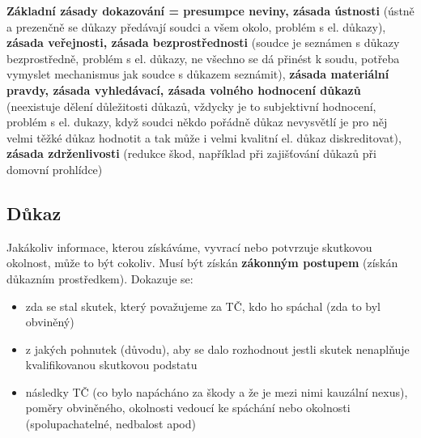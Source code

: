 \textbf{Základní zásady dokazování = presumpce neviny, zásada ústnosti} (ústně a prezenčně se
důkazy předávají soudci a všem okolo, problém s el. důkazy),  \textbf{zásada veřejnosti, zásada bezprostřednosti} (soudce je seznámen s důkazy bezprostředně, problém s el. důkazy, ne
všechno se dá přinést k soudu, potřeba vymyslet mechanismus jak soudce s důkazem seznámit), \textbf{zásada materiální pravdy, zásada vyhledávací, zásada volného
hodnocení důkazů} (neexistuje dělení důležitosti důkazů, vždycky je to subjektivní hodnocení,
problém s el. dukazy, když soudci někdo pořádně důkaz nevysvětlí je pro něj velmi těžké důkaz hodnotit a tak může i velmi kvalitní el. důkaz diskreditovat), \textbf{zásada zdrženlivosti} (redukce škod, například při zajišťování důkazů při domovní prohlídce)

\subsection{Důkaz}
Jakákoliv informace, kterou získáváme, vyvrací nebo potvrzuje skutkovou okolnost, může to být cokoliv. Musí být získán \textbf{zákonným postupem} (získán důkazním prostředkem).
Dokazuje se: 
\begin{itemize}
    \item zda se stal skutek, který považujeme za TČ, kdo ho spáchal (zda to byl obviněný)
    \item z jakých pohnutek (důvodu), aby se dalo rozhodnout jestli skutek nenaplňuje kvalifikovanou skutkovou podstatu
    \item následky TČ (co bylo napácháno za škody a že je mezi nimi kauzální nexus), poměry obviněného, okolnosti vedoucí ke spáchání nebo okolnosti (spolupachatelné, nedbalost apod)
\end{itemize}
\newpage

